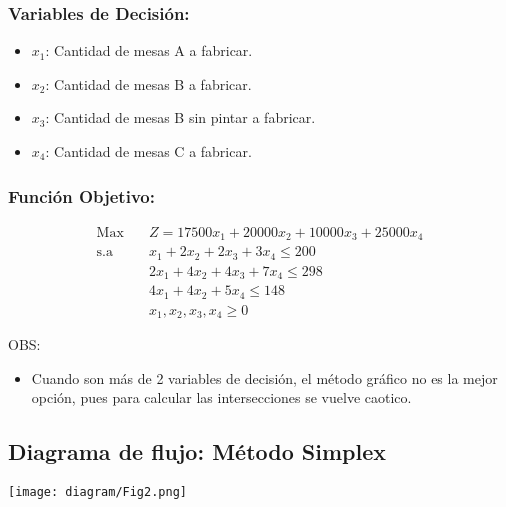 \documentclass{templateNote}
\begin{document}
\subsubsection*{Variables de Decisión:}
\begin{itemize}
    \item $x_1$: Cantidad de mesas A a fabricar.
    \item $x_2$: Cantidad de mesas B a fabricar.
    \item $x_3$: Cantidad de mesas B sin pintar a fabricar.
    \item $x_4$: Cantidad de mesas C a fabricar.
\end{itemize}

\subsubsection*{Función Objetivo:}
\begin{equation*}
    \begin{aligned}
        \text{Max} \quad & Z = 17500x_1 + 20000x_2 + 10000x_3 + 25000x_4 \\
        \text{s.a} \quad & x_1 + 2x_2 + 2x_3 + 3x_4 \leq 200 \\
        & 2x_1 + 4x_2 + 4x_3 + 7x_4 \leq 298 \\
        & 4x_1 + 4x_2 + 5x_4 \leq 148 \\
        & x_1, x_2, x_3, x_4 \geq 0
    \end{aligned}
\end{equation*}

OBS:
\begin{itemize}
    \item Cuando son más de 2 variables de decisión, el método gráfico no es la mejor opción, pues para calcular las intersecciones se vuelve caotico.
\end{itemize}

\subsection{Diagrama de flujo: Método Simplex}
\begin{center}
    \centering
    \texttt{[image: diagram/Fig2.png]}
\end{center}
\end{document}
